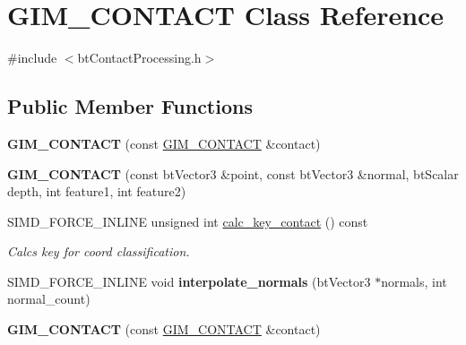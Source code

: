 \hypertarget{classGIM__CONTACT}{}\section{G\+I\+M\+\_\+\+C\+O\+N\+T\+A\+CT Class Reference}
\label{classGIM__CONTACT}


{\ttfamily \#include $<$bt\+Contact\+Processing.\+h$>$}

\subsection*{Public Member Functions}
\begin{DoxyCompactItemize}
\item 
\mbox{\label{classGIM__CONTACT_af2504893707107a602ccdcbf9af4c1ef}} 
{\bfseries G\+I\+M\+\_\+\+C\+O\+N\+T\+A\+CT} (const \hyperlink{classGIM__CONTACT}{G\+I\+M\+\_\+\+C\+O\+N\+T\+A\+CT} \&contact)
\item 
\mbox{\label{classGIM__CONTACT_a9ae6abf57110c866605dc775aedd022e}} 
{\bfseries G\+I\+M\+\_\+\+C\+O\+N\+T\+A\+CT} (const bt\+Vector3 \&point, const bt\+Vector3 \&normal, bt\+Scalar depth, int feature1, int feature2)
\item 
\mbox{\label{classGIM__CONTACT_a7d36aa50acfefd8276e59cc6c9cdb900}} 
S\+I\+M\+D\+\_\+\+F\+O\+R\+C\+E\+\_\+\+I\+N\+L\+I\+NE unsigned int \hyperlink{classGIM__CONTACT_a7d36aa50acfefd8276e59cc6c9cdb900}{calc\+\_\+key\+\_\+contact} () const
\begin{DoxyCompactList}\small\item\em Calcs key for coord classification. \end{DoxyCompactList}\item 
\mbox{\label{classGIM__CONTACT_a2e204397a9e74dc10df19faafc71e074}} 
S\+I\+M\+D\+\_\+\+F\+O\+R\+C\+E\+\_\+\+I\+N\+L\+I\+NE void {\bfseries interpolate\+\_\+normals} (bt\+Vector3 $\ast$normals, int normal\+\_\+count)
\item 
\mbox{\label{classGIM__CONTACT_af2504893707107a602ccdcbf9af4c1ef}} 
{\bfseries G\+I\+M\+\_\+\+C\+O\+N\+T\+A\+CT} (const \hyperlink{classGIM__CONTACT}{G\+I\+M\+\_\+\+C\+O\+N\+T\+A\+CT} \&contact)
\item 

\end{DoxyCompactItemize}
